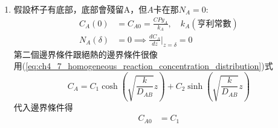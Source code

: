 \documentclass[../main.tex]{subfiles}
\begin{document}
\begin{itemize}
\begin{itemize}
\begin{enumerate}
\begin{align}
          \sqrt{\frac{k}{D_{AB}}} \delta
        \right)
      \end{align}
      代入通解得濃度分布
      \begin{equation}
        C_A = C_{A0} \left[
          \cosh \left(
            \sqrt{\frac{k}{D_{AB}}} z
          \right) - \coth \left(
            \sqrt{\frac{k}{D_{AB}}} \delta
          \right) \sinh \left(
            \sqrt{\frac{k}{D_{AB}}} z
          \right)
        \right]
      \end{equation}
      再代入Fick's 1st Law得通量
      \begin{align}
        N_A &= -D_{AB}\frac{d C_A}{dz} \nonumber\\
        &= 
        -D_{AB} C_{A0} \sqrt{\frac{k}{D_{AB}} \left[
          \sinh \left(
            \sqrt{\frac{k}{D_{AB}}} z
          \right) - \coth \left(
            \sqrt{\frac{k}{D_{AB}}} \delta
          \right) \cosh \left(
            \sqrt{\frac{k}{D_{AB}}} z
          \right)
        \right]} \nonumber \\
        \therefore \quad N_A\big|_{z=0} &= 
         C_{A0} \sqrt{k\cdot D_{AB}} \coth \left(
          \sqrt{\frac{k}{D_{AB}}} \delta
        \right) \label{eq:ch4_7_homogeneous_reaction_flux}
      \end{align}
      P.S. 若反應速率無限快，$k \rightarrow \infty$，則
      $\coth(\infty) \rightarrow 1$，代入(\ref{eq:ch4_7_homogeneous_reaction_flux})式得
      \begin{equation}
        N_A\big|_{z=0} = C_{A0} \sqrt{k\cdot D_{AB}} \quad (k \rightarrow \infty)
      \end{equation}
      \item 假設杯子有底部，底部會殘留A，但$A$卡在那$N_A=0$:
      \begin{align}
        C_A(0) &= C_{A0} = \frac{CPy_A}{k_A}, \quad k_A(\text{亨利常數})\\
        N_A(\delta) &= 0 \implies \boxed{\frac{d C_A}{dz}\big|_{z=\delta}} = 0
      \end{align}
      第二個邊界條件跟絕熱的邊界條件很像\\
      用(\ref{eq:ch4_7_homogeneous_reaction_concentration_distribution})式
      \begin{equation}
        C_A = C_1 \cosh \left(
        \sqrt{\frac{k}{D_{AB}}} z
      \right) + C_2 \sinh \left(
        \sqrt{\frac{k}{D_{AB}}} z
      \right)
      \end{equation}
      代入邊界條件得
      \begin{align}
        C_{A0} &= C_1\\

\end{align}
\end{enumerate}
\end{itemize}
\end{itemize}
\end{document}
